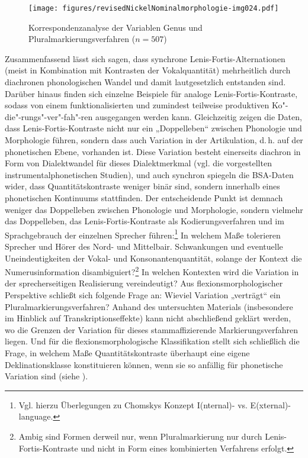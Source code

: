 \begin{figure}[h]
\texttt{[image: figures/revisedNickelNominalmorphologie-img024.pdf]}
\caption{Korrespondenzanalyse der Variablen Genus und Pluralmarkierungsverfahren ($n=507$)}
\label{fig:7}
\end{figure}

Zusammenfassend lässt sich sagen, dass synchrone Lenis-Fortis-Alternationen (meist in Kombination mit Kontrasten der Vokalquantität) mehrheitlich durch diachronen phonologischen Wandel und damit lautgesetzlich entstanden sind. Darüber hinaus finden sich einzelne Beispiele für analoge Lenis-Fortis-Kontraste, sodass von einem funktionalisierten und zumindest teilweise produktiven Ko"-die"-rungs"-ver"-fah"-ren ausgegangen werden kann. Gleichzeitig zeigen die Daten, dass Lenis-Fortis-Kontraste nicht nur ein „Doppelleben“ \citep{Seiler2008} zwischen Phonologie und Morphologie führen, sondern dass auch Variation in der Artikulation, d.\,h. auf der phonetischen Ebene, vorhanden ist. Diese Variation besteht einerseits diachron in Form von Dialektwandel für dieses Dialektmerkmal (vgl. die vorgestellten instrumentalphonetischen Studien), und auch synchron spiegeln die BSA-Daten wider, dass Quantitätskontraste weniger binär sind, sondern innerhalb eines phonetischen Kontinuums stattfinden. Der entscheidende Punkt ist demnach weniger das Doppelleben zwischen Phonologie und Morphologie, sondern vielmehr das Doppelleben, das Lenis-Fortis-Kontraste als Kodierungsverfahren und im Sprachgebrauch der einzelnen Sprecher führen:\footnote{Vgl. hierzu  Überlegungen zu Chomskys Konzept I(nternal)- vs. E(xternal)-language.} In welchem Maße tolerieren Sprecher und Hörer des Nord- und Mittelbair. Schwankungen und eventuelle Uneindeutigkeiten der Vokal- und Konsonantenquantität, solange der Kontext die Numerusinformation disambiguiert?\footnote{Ambig sind Formen derweil nur, wenn Pluralmarkierung nur durch Lenis-Fortis-Kontraste und nicht in Form eines kombinierten Verfahrens erfolgt.}  In welchen Kontexten wird die Variation in der sprecherseitigen Realisierung vereindeutigt? Aus flexionsmorphologischer Perspektive schließt sich folgende Frage an: Wieviel Variation „verträgt“ ein Pluralmarkierungsverfahren? Anhand des untersuchten Materials (insbesondere im Hinblick auf Transkriptionseffekte) kann nicht abschließend geklärt werden, wo die Grenzen der Variation für dieses stammaffizierende Markierungsverfahren liegen. Und für die flexionsmorphologische Klassifikation stellt sich schließlich die Frage, in welchem Maße Quantitätskontraste überhaupt eine eigene Deklinationsklasse konstituieren können, wenn sie so anfällig für phonetische Variation sind (siehe ).

